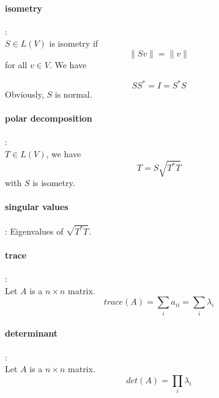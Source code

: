 \documentclass[letterpaper]{article}
\begin{document}
\paragraph{isometry}:\\
$S \in L(V)$ is isometry if
\begin{displaymath}
\|Sv\|=\|v\|
\end{displaymath}for all $v \in V$. We have

\begin{displaymath}
SS^*=I=S^*S
\end{displaymath}
Obviously, $S$ is normal.

\paragraph{polar decomposition}:\\
$T \in L(V)$, we have 
\begin{displaymath}
T=S\sqrt{T^*T}
\end{displaymath}
with $S$ is isometry.

\paragraph{singular values}: Eigenvalues of $\sqrt{T^*T}$.

\paragraph{trace}:\\
Let $A$ is a $n\times n$ matrix.
\begin{displaymath}
trace(A)=\sum_i{a_{ii}}=\sum_i{\lambda_i}
\end{displaymath}
\paragraph{determinant}:\\
Let $A$ is a $n\times n$ matrix.
\begin{displaymath}
det(A)=\prod_i{\lambda_i}
\end{displaymath}
\end{document}
